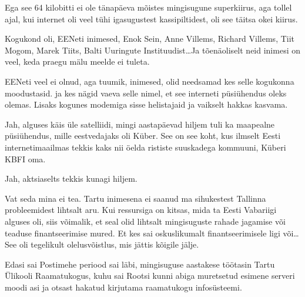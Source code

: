 Ega see 64 kilobitti ei ole tänapäeva mõistes mingisugune superkiirus, aga 
tollel ajal, kui internet oli veel tühi igasugustest kassipiltidest, oli see 
täitsa okei kiirus.


Kogukond oli,  EENeti inimesed, Enok Sein, 
Anne Villems, Richard Villems, Tiit Mogom, Marek Tiits, Balti Uuringute Instituudist\ldots	 Ja tõenäoliselt neid inimesi 
on veel, keda praegu mälu meelde ei tuleta.


EENeti veel ei olnud, aga tuumik, inimesed, olid needsamad kes  selle kogukonna 
moodustasid. ja kes nägid vaeva selle nimel, et see interneti püsiühendus oleks 
olemas. Lisaks kogunes  modemiga sisse helistajaid ja vaikselt hakkas kasvama.


Jah, alguses käis üle satelliidi, mingi aastapäevad hiljem tuli ka maapealne 
püsiühendus, mille  eestvedajaks oli Küber. See on see koht, kus 
ilmselt Eesti internetimaailmas tekkis kaks nii öelda rististe suuskadega 
kommuuni, Küberi  KBFI oma.


Jah, aktsiaselts tekkis  kunagi hiljem.


Vat seda mina ei tea. Tartu inimesena ei saanud ma sihukestest Tallinna 
probleemidest  lihtsalt aru. Kui ressursiga on kitsas, mida ta Eesti Vabariigi 
alguses oli, siis võimalik, et seal olid lihtsalt mingisuguste rahade jagamise 
või teaduse finantseerimise mured. Et kes sai oskuslikumalt finantseerimisele 
ligi või\dots See oli tegelikult olelusvõistlus, mis jättis kõigile jälje.


Edasi sai Postimehe periood sai läbi, mingisuguse aastakese töötasin Tartu 
Ülikooli Raamatukogus, kuhu sai Rootsi kunni 
abiga muretsetud esimene serveri moodi asi ja otsast hakatud kirjutama 
raamatukogu infosüsteemi.

